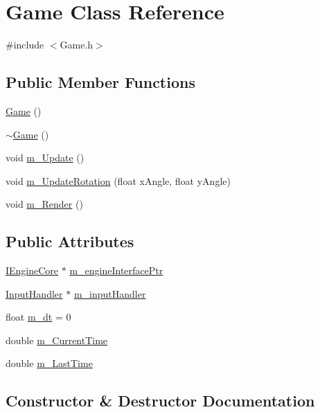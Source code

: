 \hypertarget{class_game}{}\section{Game Class Reference}
\label{class_game}


{\ttfamily \#include $<$Game.\+h$>$}

\subsection*{Public Member Functions}
\begin{DoxyCompactItemize}
\item 
\mbox{\hyperlink{class_game_ad59df6562a58a614fda24622d3715b65}{Game}} ()
\item 
\mbox{\hyperlink{class_game_ae3d112ca6e0e55150d2fdbc704474530}{$\sim$\+Game}} ()
\item 
void \mbox{\hyperlink{class_game_af7a9000e9370aa423ee3b5dda9620d54}{m\+\_\+\+Update}} ()
\item 
void \mbox{\hyperlink{class_game_a273123d60e201675b10125e5fd6924c0}{m\+\_\+\+Update\+Rotation}} (float x\+Angle, float y\+Angle)
\item 
void \mbox{\hyperlink{class_game_a7150c86176921b18dd884498085ea699}{m\+\_\+\+Render}} ()
\end{DoxyCompactItemize}
\subsection*{Public Attributes}
\begin{DoxyCompactItemize}
\item 
\mbox{\hyperlink{class_i_engine_core}{I\+Engine\+Core}} $\ast$ \mbox{\hyperlink{class_game_ad01d32edc479a3edc79e5a3d7b4281d2}{m\+\_\+engine\+Interface\+Ptr}}
\item 
\mbox{\hyperlink{struct_input_handler}{Input\+Handler}} $\ast$ \mbox{\hyperlink{class_game_a001f55f492c3fbafe8cf27eb04df293c}{m\+\_\+input\+Handler}}
\item 
float \mbox{\hyperlink{class_game_a8c30d8841546c309f40a8e128d1e9207}{m\+\_\+dt}} = 0
\item 
double \mbox{\hyperlink{class_game_a64c09b759d06281923ae87570620795b}{m\+\_\+\+Current\+Time}}
\item 
double \mbox{\hyperlink{class_game_a6b2f92aca705413c653acde07745a97e}{m\+\_\+\+Last\+Time}}
\end{DoxyCompactItemize}


\subsection{Constructor \& Destructor Documentation}
\mbox{\label{class_game_ad59df6562a58a614fda24622d3715b65}} 
